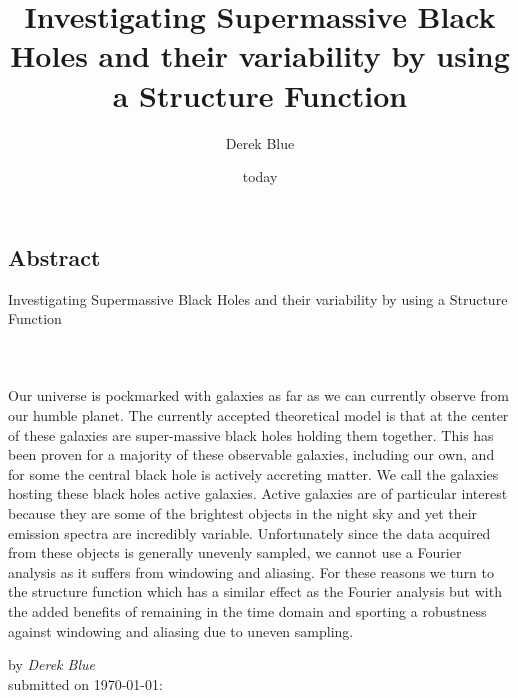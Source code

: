 \documentclass[12pt, oneside]{smuthesis}
\newcommand{\myTitle}{Investigating Supermassive Black Holes and their variability by using a Structure Function}
\begin{document}
\frontmatter
\title{\sc \myTitle}
\author{Derek Blue}
\date{today}
\medskip

\maketitle
\pagestyle{headings}

\begin{center}
\section*{\center \sc Abstract} \label{abstract}
\sc \myTitle
\paragraph*{\center  \\}
\end{center}
Our universe is pockmarked with galaxies as far as we can currently observe from our humble planet. The currently accepted theoretical model is that at the center of these galaxies are super-massive black holes holding them together. This has been proven for a majority of these observable galaxies, including our own, and for some the central black hole is actively accreting matter. We call the galaxies hosting these black holes active galaxies. Active galaxies are of particular interest because they are some of the brightest objects in the night sky and yet their emission spectra are incredibly variable. Unfortunately since the data acquired from these objects is generally unevenly sampled, we cannot use a Fourier analysis as it suffers from windowing and aliasing. For these reasons we turn to the structure function which has a similar effect as the Fourier analysis but with the added benefits of remaining in the time domain and sporting a robustness against windowing and aliasing due to uneven sampling.

\begin{center}
by {\em Derek Blue}\\
submitted on \today:\\
\end{center}
\newpage

\tableofcontents
\listoffigures
\listoftables
\newpage
%
\mainmatter
\end{document}
